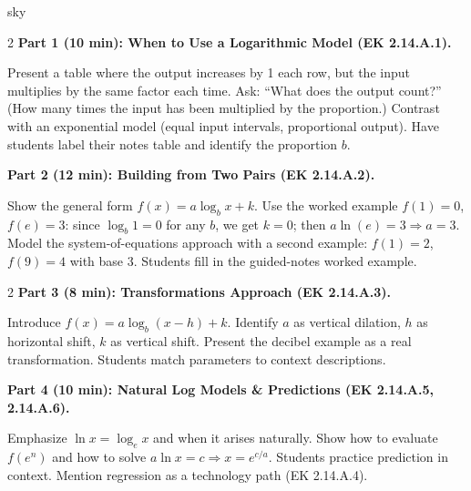 \documentclass[10pt]{article}
\begin{document}
\begin{skillbox}[Lesson]{sky}
\begin{multicols}{2}
\textbf{Part 1 (10 min): When to Use a Logarithmic Model (EK 2.14.A.1).}

Present a table where the output increases by 1 each row, but the input multiplies by the
same factor each time. Ask: ``What does the output count?'' (How many times the input has
been multiplied by the proportion.) Contrast with an exponential model (equal input intervals,
proportional output). Have students label their notes table and identify the proportion $b$.

\columnbreak

\textbf{Part 2 (12 min): Building from Two Pairs (EK 2.14.A.2).}

Show the general form $f(x) = a\log_b x + k$. Use the worked example $f(1)=0$, $f(e)=3$:
since $\log_b 1 = 0$ for any $b$, we get $k = 0$; then $a\ln(e) = 3 \Rightarrow a = 3$.
Model the system-of-equations approach with a second example: $f(1)=2$, $f(9)=4$ with base 3.
Students fill in the guided-notes worked example.
\end{multicols}

\begin{multicols}{2}
\textbf{Part 3 (8 min): Transformations Approach (EK 2.14.A.3).}

Introduce $f(x) = a\log_b(x-h)+k$. Identify $a$ as vertical dilation, $h$ as horizontal
shift, $k$ as vertical shift. Present the decibel example as a real transformation. Students
match parameters to context descriptions.

\columnbreak

\textbf{Part 4 (10 min): Natural Log Models \& Predictions (EK 2.14.A.5, 2.14.A.6).}

Emphasize $\ln x = \log_e x$ and when it arises naturally. Show how to evaluate $f(e^n)$
and how to solve $a\ln x = c \Rightarrow x = e^{c/a}$. Students practice prediction in
context. Mention regression as a technology path (EK 2.14.A.4).
\end{multicols}
\end{skillbox}
\end{document}
